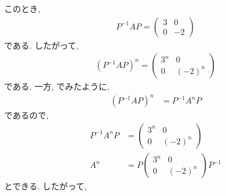 このとき,
\begin{align*}
  P^{-1}AP=
  \begin{pmatrix}
    3&0\\
    0&-2
  \end{pmatrix}
\end{align*}
である.
したがって,
\begin{align*}
  (P^{-1}AP)^n=
  \begin{pmatrix}
    3^n&0\\
    0&(-2)^n
  \end{pmatrix}
\end{align*}
である. 一方, でみたように,
\begin{align*}
  (P^{-1}AP)^n
  &=P^{-1}A^nP
\end{align*}
であるので,
\begin{align*}
P^{-1}A^nP&=
  \begin{pmatrix}
    3^n&0\\
    0&(-2)^n
  \end{pmatrix}
\\
A^n&=
P
  \begin{pmatrix}
    3^n&0\\
    0&(-2)^n
  \end{pmatrix}
  P^{-1}
\end{align*}
とできる.
したがって,
